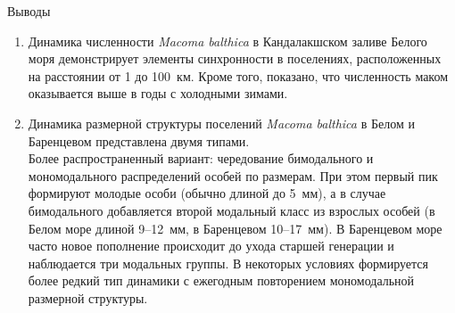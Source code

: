 \documentclass{beamer}
\begin{document}
\begin{small}
\begin{frame}{Выводы}
	\begin{enumerate}
\addtocounter{enumi}{7}
		\item Динамика численности {\it Macoma balthica} в Кандалакшском заливе Белого моря демонстрирует элементы синхронности в поселениях, расположенных на расстоянии от 1 до 100~км. Кроме того, показано, что численность маком оказывается выше в годы с холодными зимами.
		\item Динамика размерной структуры поселений {\it Macoma balthica} в Белом и Баренцевом представлена двумя типами. \\
Более распространенный вариант: чередование бимодального и мономодального распределений особей по размерам. При этом первый пик формируют молодые особи (обычно длиной до 5~мм), а в случае бимодального добавляется второй модальный класс из взрослых особей (в Белом море длиной 9--12~мм, в Баренцевом 10--17~мм). В Баренцевом море часто новое пополнение происходит до ухода старшей генерации и наблюдается три модальных группы. 
В некоторых условиях формируется более редкий тип динамики с ежегодным повторением мономодальной размерной структуры.
	\end{enumerate}
\end{frame}

\end{small}
\end{document}
